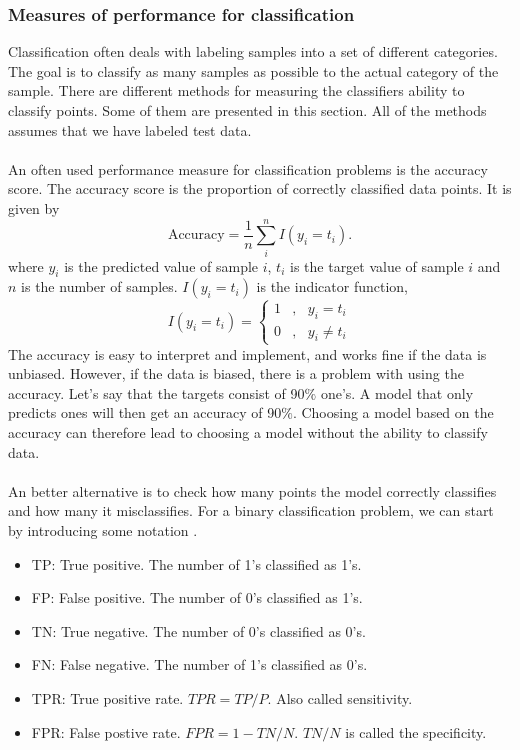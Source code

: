 \subsubsection{Measures of performance for classification}
Classification often deals with labeling samples into a set of different categories. The goal is to classify as many samples as possible to the actual category of the sample. There are different methods for measuring the classifiers ability to classify points. Some of them are presented in this section. All of the methods assumes that we have labeled test data. 
\\
\\
An often used performance measure for classification problems is the accuracy score. The accuracy score is the proportion of correctly classified data points. It is given by
\begin{equation}
    \text{Accuracy} = \frac{1}{n}\sum_i^n I(y_i = t_i). 
\end{equation}
where $y_i$ is the predicted value of sample $i$, $t_i$ is the target value of sample $i$ and $n$ is the number of samples. $I(y_i = t_i)$ is the indicator function,
\begin{equation}
    I(y_i = t_i) = \begin{cases}
    1 & ,\text{ } y_i = t_i \\
    0 & ,\textit{ } y_i \neq t_i
    \end{cases}
\end{equation}
The accuracy is easy to interpret and implement, and works fine if the data is unbiased. However, if the data is biased, there is a problem with using the accuracy. Let's say that the targets consist of 90$\%$ one's. A model that only predicts ones will then get an accuracy of 90$\%$. Choosing a model based on the accuracy can therefore lead to choosing a model without the ability to classify data. 
\\
\\
An better alternative is to check how many points the model correctly classifies and how many it misclassifies. For a binary classification problem, we can start by introducing some notation \cite{Hands-On}.  
\begin{itemize}
    \item TP: True positive. The number of 1's classified as 1's. 
    \item FP: False positive. The number of 0's classified as 1's. 
    \item TN: True negative. The number of 0's classified as 0's. 
    \item FN: False negative. The number of 1's classified as 0's.
    \item TPR: True positive rate. $TPR = TP/P$. Also called sensitivity. 
    \item FPR: False postive rate. $FPR = 1 - TN/N$. $TN/N$ is called the specificity. 
\end{itemize}
